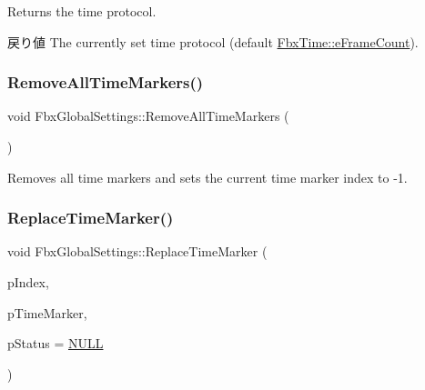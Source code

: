Returns the time protocol. \begin{DoxyReturn}{戻り値}
The currently set time protocol (default \hyperlink{class_fbx_time_a10ffa1fdce0aa7f63ec24bdd23afff4bac289d3a9f084368221a07a3c95817bef}{Fbx\+Time\+::e\+Frame\+Count}). 
\end{DoxyReturn}
\mbox{\label{class_fbx_global_settings_ac321c450c9dfd0897993fdcef901bf58}} 
\subsubsection{\texorpdfstring{Remove\+All\+Time\+Markers()}{RemoveAllTimeMarkers()}}
{\footnotesize\ttfamily void Fbx\+Global\+Settings\+::\+Remove\+All\+Time\+Markers (\begin{DoxyParamCaption}{ }\end{DoxyParamCaption})}



Removes all time markers and sets the current time marker index to -\/1. 

\mbox{\label{class_fbx_global_settings_a5b78d64fc99da9327f571d13f222bd8a}} 
\subsubsection{\texorpdfstring{Replace\+Time\+Marker()}{ReplaceTimeMarker()}}
{\footnotesize\ttfamily void Fbx\+Global\+Settings\+::\+Replace\+Time\+Marker (\begin{DoxyParamCaption}\item[{int}]{p\+Index,  }\item[{const \hyperlink{struct_fbx_global_settings_1_1_time_marker}{Time\+Marker} \&}]{p\+Time\+Marker,  }\item[{\hyperlink{class_fbx_status}{Fbx\+Status} $\ast$}]{p\+Status = {\ttfamily \hyperlink{fbxarch_8h_a070d2ce7b6bb7e5c05602aa8c308d0c4}{N\+U\+LL}} }\end{DoxyParamCaption})}

